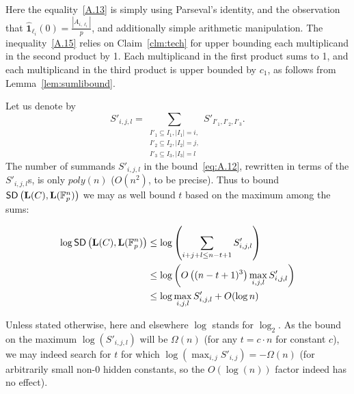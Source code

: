 Here the equality~\ref{A.13} is simply using Parseval's identity, and the observation that $\widehat{\mathbf{1}}_{\ell_i}(0)=\frac{|A_{i,\ell_i}|}{p}$, and additionally simple arithmetic manipulation.
The inequality~\ref{A.15} relies on Claim~\ref{clm:tech} for upper bounding each multiplicand in the second product by 1.
Each multiplicand in the first product sums to 1, and each multiplicand in the third product is upper bounded by $c_1$, as follows from Lemma~\ref{lem:sumlibound}.


Let us denote by
$$S'_{i,j,l}=\sum_{\substack{I'_1\subseteq I_1,|I_1|=i,\\
I'_2\subseteq I_2,|I_2|=j,\\I'_3\subseteq I_3,|I_3|=l}}S'_{I'_1,I'_2,I'_3} .$$ 
The number of summands $S'_{i,j,l}$ in the bound~\ref{eq:A.12}, rewritten in terms of the $S'_{i,j,l}$s, is only $poly(n)$ ($O(n^2)$, to be precise). 
Thus to bound $\mathsf{SD} \left({\mathbf{L}(C)},{\mathbf{L}(\mathbb{F}^n_p)} \right)$ we may as well bound $t$ based on the maximum among the sums:

\begin{align}
  \log{\ensuremath{\mathsf{SD} \left({\mathbf{L}(C)},{\mathbf{L}(\mathbb{F}^n_p)} \right)}} &\leq \log \left(\sum_{i+j+l\leq n-t+1}S'_{i,j,l} \right) \nonumber \\
  &\leq \log \left(O \left((n-t+1)^3 \right) \max_{i,j,l} S'_{i,j,l} \right) \nonumber \\
  &\leq \log{\max_{i,j,l}S'_{i,j,l}} + O(\log{n}) \nonumber
\end{align}

Unless stated otherwise, here and elsewhere $\log$ stands for $\log_2$.
As the bound on the maximum $\log(S'_{i,j,l})$ will be $\Omega(n)$ (for any $t = c\cdot n$ for constant $c$), we may indeed
search for $t$ for which $\log \left( \max_{i,j}S'_{i,j}\right) = -\Omega(n)$ (for arbitrarily small non-0 hidden constants, so the $O(\log(n))$ factor indeed has no effect).


